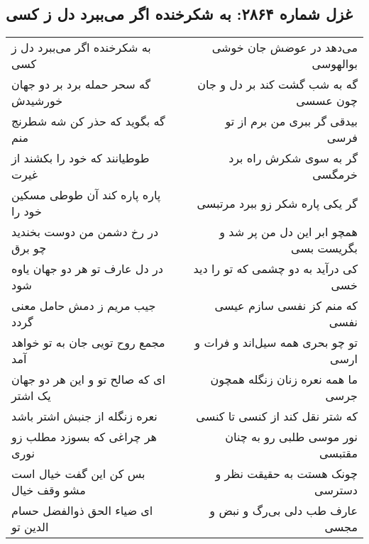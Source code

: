 \begin{center}
\section*{غزل شماره ۲۸۶۴: به شکرخنده اگر می‌ببرد دل ز کسی}
\label{sec:2864}
\begin{longtable}{l p{0.5cm} r}
به شکرخنده اگر می‌ببرد دل ز کسی
&&
می‌دهد در عوضش جان خوشی بوالهوسی
\\
گه سحر حمله برد بر دو جهان خورشیدش
&&
گه به شب گشت کند بر دل و جان چون عسسی
\\
گه بگوید که حذر کن شه شطرنج منم
&&
بیدقی گر ببری من برم از تو فرسی
\\
طوطیانند که خود را بکشند از غیرت
&&
گر به سوی شکرش راه برد خرمگسی
\\
پاره پاره کند آن طوطی مسکین خود را
&&
گر یکی پاره شکر زو ببرد مرتبسی
\\
در رخ دشمن من دوست بخندید چو برق
&&
همچو ابر این دل من پر شد و بگریست بسی
\\
در دل عارف تو هر دو جهان یاوه شود
&&
کی درآید به دو چشمی که تو را دید خسی
\\
جیب مریم ز دمش حامل معنی گردد
&&
که منم کز نفسی سازم عیسی نفسی
\\
مجمع روح تویی جان به تو خواهد آمد
&&
تو چو بحری همه سیل‌اند و فرات و ارسی
\\
ای که صالح تو و این هر دو جهان یک اشتر
&&
ما همه نعره زنان زنگله همچون جرسی
\\
نعره زنگله از جنبش اشتر باشد
&&
که شتر نقل کند از کنسی تا کنسی
\\
هر چراغی که بسوزد مطلب زو نوری
&&
نور موسی طلبی رو به چنان مقتبسی
\\
بس کن این گفت خیال است مشو وقف خیال
&&
چونک هستت به حقیقت نظر و دسترسی
\\
ای ضیاء الحق ذوالفضل حسام الدین تو
&&
عارف طب دلی بی‌رگ و نبض و مجسی
\\
\end{longtable}
\end{center}
